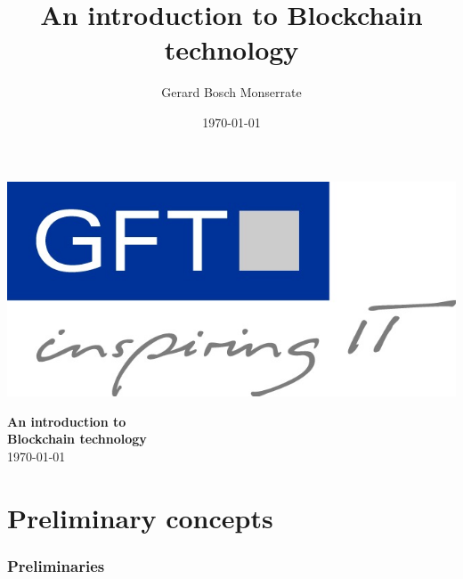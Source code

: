 \documentclass[notitlepage, usenames,dvipsnames]{beamer}
\title[Introduction to Blockchain Technology]{An introduction to Blockchain technology}
\author[Gerard Bosch]{Gerard Bosch Monserrate}
\institute{\email{gerard.bosch@gmail.com}}
\date{\today}
\begin{document}
\begin{frame}
\begin{center}
\vspace{-4mm}\begin{center}\includegraphics[scale=0.15]{../img/gft.jpg}\end{center}

\vspace{1cm}
{\huge \bfseries \textcolor{MidnightBlue!100!bg}{ An introduction to\\[3mm] Blockchain technology }} \\[3mm]

\vspace{2cm}\today
\end{center}
\end{frame}



{}


\section{Preliminary concepts}
\begin{frame}
    \frametitle{Preliminaries}

\end{frame}
\end{document}

